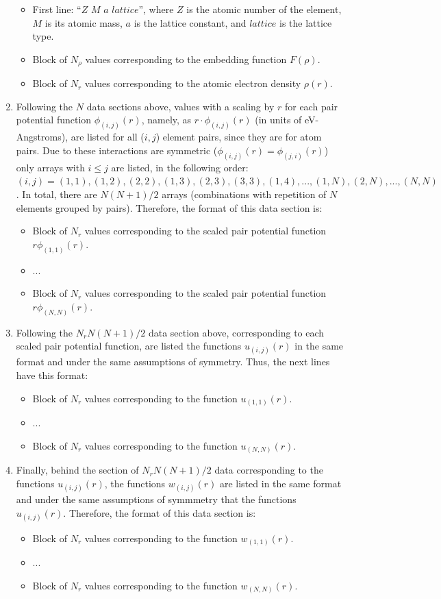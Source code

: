 \documentclass{article}
\begin{document}
\begin{enumerate}
	\begin{itemize}
		\item First line: ``$Z$ $M$ $a$ $lattice$'', where $Z$ is the atomic number of the element, $M$ is its atomic mass, $a$ is the lattice constant, and $lattice$ is the lattice type.
		\item Block of $N_\rho$ values corresponding to the embedding function $F(\rho)$.
		\item Block of $N_r$ values corresponding to the atomic electron density $\rho(r)$.
	\end{itemize}
	\item Following the $N$ data sections above, values with a scaling by $r$ for each pair potential function $\phi_{(i,j)}(r)$, namely, as $r\cdot\phi_{(i,j)}(r)$ (in units of eV-Angstroms), are listed for all ($i,j$)
	element pairs, since they are for atom pairs. Due to these interactions are symmetric ($\phi_{(i,j)}(r)=\phi_{(j,i)}(r)$) only arrays with $i\leq j$ are listed, in the following order: $(i,j)=(1,1),(1,2),(2,2),(1,3),(2,3),(3,3),(1,4),...,(1,N),(2,N),...,(N,N)$. In total, there are $N(N+1)/2$ arrays (combinations with repetition of $N$ elements grouped by pairs). Therefore, the format of this data section is:
	\begin{itemize}
		\item Block of $N_r$ values corresponding to the scaled pair potential function $r\phi_{(1,1)}(r)$.
		\item ...
		\item Block of $N_r$ values corresponding to the scaled pair potential function $r\phi_{(N,N)}(r)$.
	\end{itemize}
	\item Following the $N_r N(N+1)/2$ data section above, corresponding to each scaled pair potential function, are listed the functions $u_{(i,j)}(r)$ in the same format and under the same assumptions of symmetry. Thus, the next lines have this format:
	\begin{itemize}
		\item Block of $N_r$ values corresponding to the function $u_{(1,1)}(r)$.
		\item ...
		\item Block of $N_r$ values corresponding to the function $u_{(N,N)}(r)$.
	\end{itemize}
	\item Finally, behind the section of $N_r N(N+1)/2$ data corresponding to the functions $u_{(i,j)}(r)$, the functions $w_{(i,j)}(r)$ are listed in the same format and under the same assumptions of symmmetry that the functions $u_{(i,j)}(r)$. Therefore, the format of this data section is:
	\begin{itemize}
		\item Block of $N_r$ values corresponding to the function $w_{(1,1)}(r)$.
		\item ...
		\item Block of $N_r$ values corresponding to the function $w_{(N,N)}(r)$.
	\end{itemize}
\end{enumerate}
\end{document}
